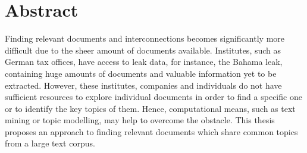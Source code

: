 \chapter*{Abstract}


Finding relevant documents and interconnections becomes significantly more difficult due to the sheer amount of documents available.
Institutes, such as German tax offices, have access to leak data, for instance, the Bahama leak, containing huge amounts of documents and valuable information yet to be extracted.
However, these institutes, companies and individuals do not have sufficient resources to explore individual documents in order to find a specific one or to identify the key topics of them.
Hence, computational means, such as text mining or topic modelling, may help to overcome the obstacle.
This thesis proposes an approach to finding relevant documents which share common topics from a large text corpus.